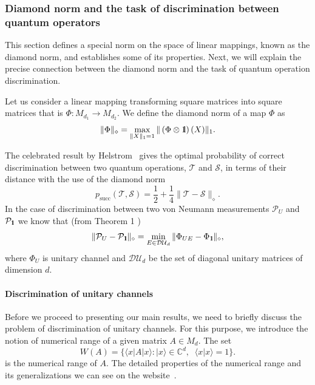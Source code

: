 \documentclass[preprint,12pt, a4paper]{elsarticle}
\newcommand{\ket}[1]{\ensuremath{|#1\rangle}}
\newcommand{\bra}[1]{\ensuremath{\langle#1|}}
\newcommand{\braket}[2]{\ensuremath{\langle{#1}|{#2}\rangle}}
\newcommand{\1}{{\rm 1\hspace{-0.9mm}l}}
\newcommand{\Id}{{\rm 1\hspace{-0.9mm}l}}
\newcommand{\TT}{\mathcal{T}}
\newcommand{\PP}{\mathcal{P}}
\renewcommand{\SS}{\mathcal{S}}
\newcommand{\diaguni}{\ensuremath{\mathcal{DU}}}
\begin{document}
\subsubsection{Diamond norm and the task of discrimination between quantum operators}
This section defines a special norm on the space of linear mappings, known as 
the diamond norm, and establishes some of its properties. 
Next, we will explain the precise connection between the diamond
norm and the task of quantum operation discrimination. 

Let us  consider a  linear mapping transforming  square matrices into square 
matrices that is $\Phi: M_{d_1} \to M_{d_2}$. 
We define the diamond norm of a map $\Phi$ as 
\begin{equation}
\|\Phi\|_\diamond = \max_{\|X\|_1=1} \| \left(\Phi \otimes \1\right) (X) \|_1.
\end{equation}





The celebrated result by Helstrom~\cite{helstrom1976quantum} gives the optimal  probability of correct discrimination between two quantum operations, $\TT$  and $\SS$, 
in terms of their distance with the use of the diamond norm
\begin{equation}
p_{\text{succ}}(\TT, \SS) =  \frac12 + \frac14 \| \TT - \SS \|_\diamond.
\end{equation}
In the case of discrimination between two von Neumann measurements $\PP_U$ and 
$\PP_\Id$ we know that (from Theorem 1 \cite{puchala2018strategies})
\begin{equation}
\|\PP_U - \PP_\Id\|_\diamond = \min_{E \in \diaguni_d} \|\Phi_{UE} - 
\Phi_\Id\|_\diamond,
\end{equation}
where $\Phi_U$ is unitary channel and $\diaguni_d$ be the set of diagonal 
unitary matrices of dimension $d$. 



\paragraph{Discrimination of unitary channels}

Before we proceed to presenting our main results, we need to briefly discuss the
problem of discrimination of unitary channels.  For this purpose, we introduce the notion of numerical range of
a given matrix $A \in M_d$. The set \begin{equation}
W(A) =\{\bra{x}A\ket{x}: \ket{x} \in 
\mathbb{C}^d, \;
\;\braket{x}{x}=1\}.
\end{equation}   
is the numerical range of $A$.
The detailed properties of the numerical range and its generalizations we can see on the website~\cite{nr}. 
\end{document}

